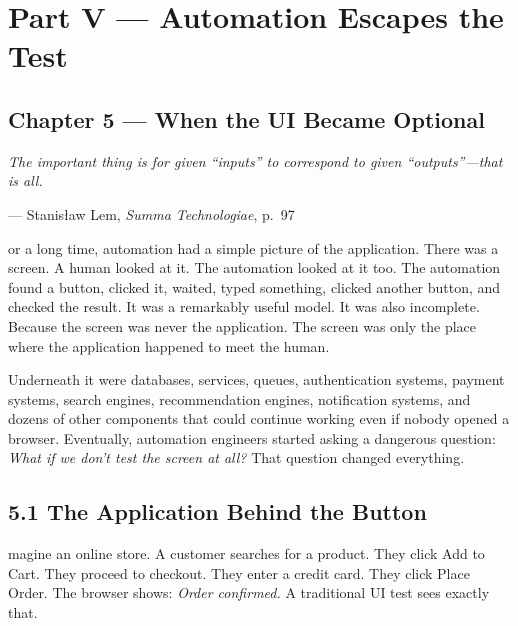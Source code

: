 \documentclass[11pt, a4paper, openany]{book}
\newcommand{\initialcap}[1]{{\fontfamily{lmss}\selectfont\huge\textbf{#1}}}
\providecommand{\epigraphlem}[2]{%
  \begin{flushright}\begin{minipage}{0.72\textwidth}\raggedleft
  \itshape #1\par\vspace{0.4em}\normalfont\small --- #2
  \end{minipage}\end{flushright}\vspace{1.2em}}
\begin{document}
\mainmatter

\chapter*{Part V --- Automation Escapes the Test}

\section*{Chapter 5 --- When the UI Became Optional}

\epigraphlem{The important thing is for given ``inputs'' to correspond to given ``outputs''---that is all.}{Stanisław Lem, \textit{Summa Technologiae}, p.~97}


\noindent \initialcap{F}or a long time, automation had a simple picture of the application. There was a screen. A human looked at it. The automation looked at it too. The automation found a button, clicked it, waited, typed something, clicked another button, and checked the result. It was a remarkably useful model. It was also incomplete. Because the screen was never the application. The screen was only the place where the application happened to meet the human. 

Underneath it were databases, services, queues, authentication systems, payment systems, search engines, recommendation engines, notification systems, and dozens of other components that could continue working even if nobody opened a browser. Eventually, automation engineers started asking a dangerous question: \textit{What if we don't test the screen at all?} That question changed everything.

\section{5.1 The Application Behind the Button}
\noindent \initialcap{I}magine an online store. A customer searches for a product. They click Add to Cart. They proceed to checkout. They enter a credit card. They click Place Order. The browser shows: \textit{Order confirmed.} A traditional UI test sees exactly that. 
\end{document}
